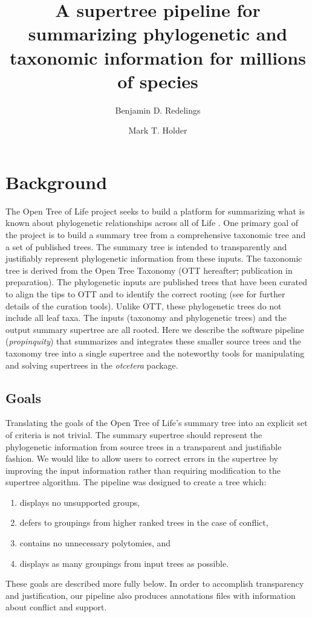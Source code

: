 \documentclass[fleqn,12pt,lineno,english]{wlpeerj}
\title{A supertree pipeline for summarizing phylogenetic and taxonomic information
for millions of species}
\author[1,2]{Benjamin D. Redelings}
\author[2,3,4]{Mark T. Holder}
\affil[1]{Department of Biology, Duke University, Durham NC, US}
\affil[2]{Department of Ecology and Evolutionary Biology, University of Kansas, Lawrence KS, US}
\affil[3]{Biodiversity Institute, University of Kansas, Lawrence KS, US}
\affil[4]{Heidelberg Institute for Theoretical Studies, Heidelberg, Germany}
\providecommand{\DIFaddtex}[1]{{\protect\color{blue}\uwave{#1}}} %
\providecommand{\DIFdeltex}[1]{{\protect\color{red}\sout{#1}}}                      %
\providecommand{\DIFaddbegin}{} %
\providecommand{\DIFaddend}{} %
\providecommand{\DIFdelbegin}{} %
\providecommand{\DIFdelend}{} %
\providecommand{\DIFadd}[1]{\texorpdfstring{\DIFaddtex{#1}}{#1}} %
\providecommand{\DIFdel}[1]{\texorpdfstring{\DIFdeltex{#1}}{}} %
\begin{document}
\flushbottom
\maketitle
\thispagestyle{empty}

\section{Background}

The Open Tree of Life project seeks to build a platform for summarizing
what is known about phylogenetic relationships across all of Life
\citep{HinchliffEtAl2015}. One primary goal of the project is to
build a summary tree from a comprehensive taxonomic tree and a set
of published trees. The summary tree is intended to transparently
and justifiably represent phylogenetic information from these inputs.
The taxonomic tree is derived from the Open Tree Taxonomy (OTT hereafter\DIFdelbegin \DIFdel{,
}\DIFdelend \DIFaddbegin \DIFadd{;
}\DIFaddend publication in preparation). The phylogenetic inputs are published
trees that have been curated to align the tips to OTT and to identify
the correct rooting (see \citealt{McTavishEtAt2015} for further details
of the curation tools). Unlike OTT, these phylogenetic trees do not
include all leaf taxa. The inputs (taxonomy and phylogenetic trees)
and the output summary supertree are all rooted. Here we describe
the software pipeline (\emph{propinquity}) that summarizes and integrates
these smaller source trees and the taxonomy tree into a single supertree
and the noteworthy tools for manipulating and solving supertrees in
the \emph{otcetera} package.

\subsection{Goals}

Translating the goals of the Open Tree of Life's summary tree into
an explicit set of criteria is not trivial. The summary supertree
should represent the phylogenetic information from source trees in
a transparent and justifiable fashion. We would like to allow users
to correct errors in the supertree by improving the input information
rather than requiring modification to the supertree algorithm. The
pipeline was designed to create a tree which:
 \begin{enumerate} 
\item displays no unsupported groups,
\item defers to groupings from higher ranked trees in the case of conflict, 
\item contains no unnecessary polytomies, and
\item displays as many groupings from input trees as possible.
 \end{enumerate} 
These goals are described more fully below. In order to accomplish
transparency and justification, our pipeline also produces annotations
files with information about conflict and support.
\end{document}
